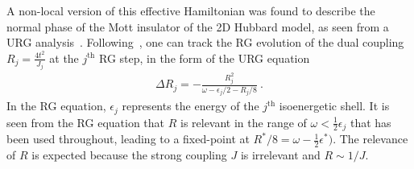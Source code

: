 \documentclass[reprint,prb,superscriptaddress]{revtex4-2}
\begin{document}
A non-local version of this effective Hamiltonian was found to describe the normal phase of the Mott insulator of the 2D Hubbard model, as seen from a URG analysis~\cite{anirbanmott1,anirbanmott2}. Following~\cite{anirbanmott1}, one can track the RG evolution of the dual coupling \(R_j = \frac{4t^2}{J_j}\) at the \(j^\text{th}\) RG step, in the form of the URG equation
\begin{equation}\begin{aligned}
	\Delta R_j =- \frac{R_j^2}{\omega - \epsilon_{j}/2 - R_j/8}~.
\end{aligned}\end{equation}
In the RG equation, \(\epsilon_{j}\) represents the energy of the \(j^\text{th}\) isoenergetic shell. It is seen from 
the RG equation that \(R\) is relevant in the range of \(\omega < \frac{1}{2}\epsilon_j\) that has been used throughout, leading to a fixed-point at \(R^*/8 = \omega - \frac{1}{2}\epsilon^*)\). The relevance of \(R\) is expected because the strong coupling \(J\) is irrelevant and \(R \sim 1/J\).
\end{document}
